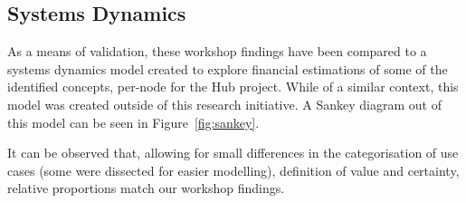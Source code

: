 \documentclass[journal]{IEEEtran}
\begin{document}
\subsection{Systems Dynamics}

As a means of validation, these workshop findings have been compared
to a systems dynamics model created to explore financial estimations
of some of the identified concepts, per-node for the Hub
project. While of a similar context, this model was created outside of
this research initiative. A Sankey diagram out of this model can be
seen in Figure~\ref{fig:sankey}.

It can be observed that, allowing for small differences in the
categorisation of use cases (some were dissected for easier
modelling), definition of value and certainty, relative proportions
match our workshop findings.
 
\end{document}
